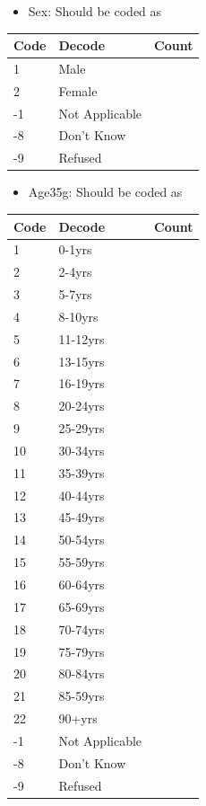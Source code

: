\documentclass[
  11pt,
]{article}
\providecommand{\tightlist}{%
  \setlength{\itemsep}{0pt}\setlength{\parskip}{0pt}}
\begin{document}
\begin{itemize}
\tightlist
\item
  Sex: Should be coded as
\end{itemize}

\begin{longtable}[]{@{}lll@{}}
\toprule()
Code & Decode & Count \\
\midrule()
\endhead
1 & Male & \\
2 & Female & \\
-1 & Not Applicable & \\
-8 & Don't Know & \\
-9 & Refused & \\
\bottomrule()
\end{longtable}

\begin{itemize}
\tightlist
\item
  Age35g: Should be coded as
\end{itemize}

\begin{longtable}[]{@{}lll@{}}
\toprule()
Code & Decode & Count \\
\midrule()
\endhead
1 & 0-1yrs & \\
2 & 2-4yrs & \\
3 & 5-7yrs & \\
4 & 8-10yrs & \\
5 & 11-12yrs & \\
6 & 13-15yrs & \\
7 & 16-19yrs & \\
8 & 20-24yrs & \\
9 & 25-29yrs & \\
10 & 30-34yrs & \\
11 & 35-39yrs & \\
12 & 40-44yrs & \\
13 & 45-49yrs & \\
14 & 50-54yrs & \\
15 & 55-59yrs & \\
16 & 60-64yrs & \\
17 & 65-69yrs & \\
18 & 70-74yrs & \\
19 & 75-79yrs & \\
20 & 80-84yrs & \\
21 & 85-59yrs & \\
22 & 90+yrs & \\
-1 & Not Applicable & \\
-8 & Don't Know & \\
-9 & Refused & \\
\bottomrule()
\end{longtable}
\end{document}
